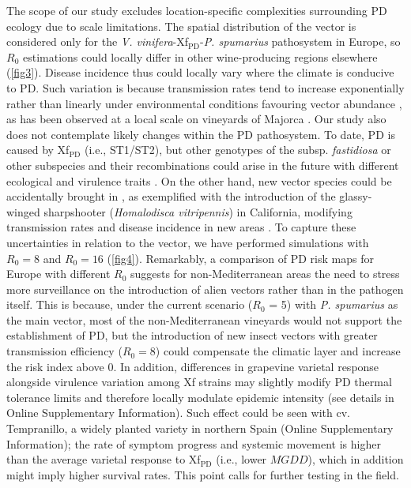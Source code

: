     The scope of our study excludes location-specific complexities surrounding
    PD
    ecology due to scale limitations. The spatial distribution of the vector is
    considered only for the \textit{V. vinifera}-Xf$_{\textrm{PD}}$-{\textit{P.
        spumarius}} pathosystem in Europe, so $R_0$ estimations could locally
    differ in
    other wine-producing regions elsewhere (\cref{fig3}). Disease incidence
    thus
    could locally vary where the climate is conducive to PD. Such variation is
    because transmission rates tend to increase exponentially rather than
    linearly
    under environmental conditions favouring vector abundance
    \cite{Gruber2012}, as
    has been observed at a local scale on vineyards of Majorca
    \cite{Moralejo2019}.
    Our study also does not contemplate likely changes within the PD
    pathosystem.
    To date, PD is caused by Xf$_{\textrm{PD}}$ (i.e., ST1/ST2), but other
    genotypes of the subsp. \textit{fastidiosa} or other subspecies and their
    recombinations could arise in the future with different ecological and
    virulence traits \cite{Vanhove2019}. On the other hand, new vector species
    could be accidentally brought in \cite{Redak2004}, as exemplified with the
    introduction of the glassy-winged sharpshooter (\textit{Homalodisca
        vitripennis}) in California, modifying transmission rates and disease
    incidence
    in new areas \cite{Daugherty2019}. To capture these uncertainties in
    relation
    to the vector, we have performed simulations with $R_0 = 8$ and $R_0 = 16$
    (\cref{fig4}). Remarkably, a comparison of PD risk maps for Europe with
    different $R_0$ suggests for non-Mediterranean areas the need to stress
    more
    surveillance on the introduction of alien vectors rather than in the
    pathogen
    itself. This is because, under the current scenario ($R_0$ = 5) with
    \textit{P.
        spumarius} as the main vector, most of the non-Mediterranean vineyards
    would
    not support the establishment of PD, but the introduction of new insect
    vectors
    with greater transmission efficiency ($R_0=8$) could compensate the
    climatic
    layer and increase the risk index above 0. In addition, differences in
    grapevine varietal response alongside virulence variation among Xf strains
    may
    slightly modify PD thermal tolerance limits and therefore locally modulate
    epidemic intensity (see details in Online Supplementary Information). Such
    effect
    could be seen with cv. Tempranillo, a widely planted variety in northern
    Spain
    (Online Supplementary Information); the rate of symptom progress and
    systemic movement is
    higher
    than the average varietal response to Xf$_{\textrm{PD}}$ (i.e., lower
$MGDD$),
    which in addition might imply higher survival rates. This point calls for
    further testing in the field.

